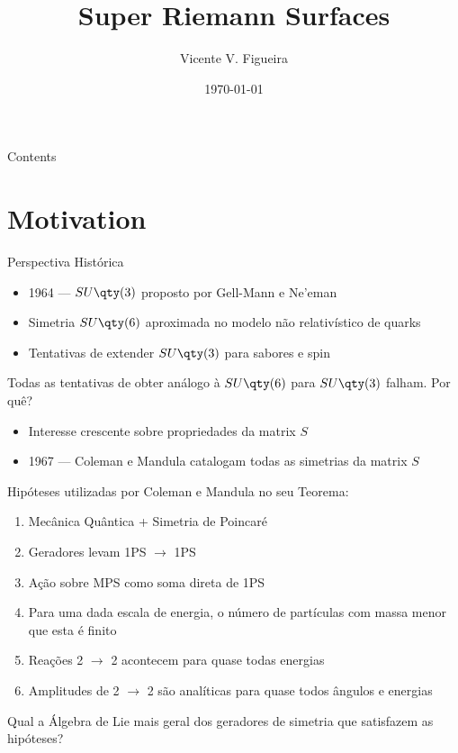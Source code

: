 \documentclass{beamer}
\title{Super Riemann Surfaces}
\author{Vicente V. Figueira}
\institute{IF-USP}
\date{\today}
\begin{document}
\begin{frame}
    \titlepage
\end{frame}

\begin{frame}{Contents}
    \tableofcontents
\end{frame}

\section{Motivation}
\begin{frame}{Perspectiva Histórica}
    \begin{itemize}
        \item 1964 --- $SU\qty(3)$ proposto por Gell-Mann e Ne'eman
        \item Simetria $SU\qty(6)$ aproximada no modelo não relativístico de quarks
        \item Tentativas de extender $SU\qty(3)$ para sabores e spin
    \end{itemize}
    Todas as tentativas de obter análogo à $SU\qty(6)$ para $SU\qty(3)$ falham. Por quê?
    \begin{itemize}
        \item Interesse crescente sobre propriedades da matrix $S$
        \item 1967 --- Coleman e Mandula catalogam todas as simetrias da matrix $S$
    \end{itemize}
\end{frame}

\begin{frame}
    Hipóteses utilizadas por Coleman e Mandula no seu Teorema:
    \begin{enumerate}
        \item Mecânica Quântica + Simetria de Poincaré
        \item Geradores levam 1PS $\rightarrow$ 1PS
        \item Ação sobre MPS como soma direta de 1PS
        \item Para uma dada escala de energia, o número de partículas com massa menor que esta é finito
        \item Reações 2 $\rightarrow$ 2 acontecem para quase todas energias
        \item Amplitudes de 2 $\rightarrow$ 2 são analíticas para quase todos ângulos e energias
    \end{enumerate}
    Qual a Álgebra de Lie mais geral dos geradores de simetria que satisfazem as hipóteses?
\end{frame}
\end{document}
